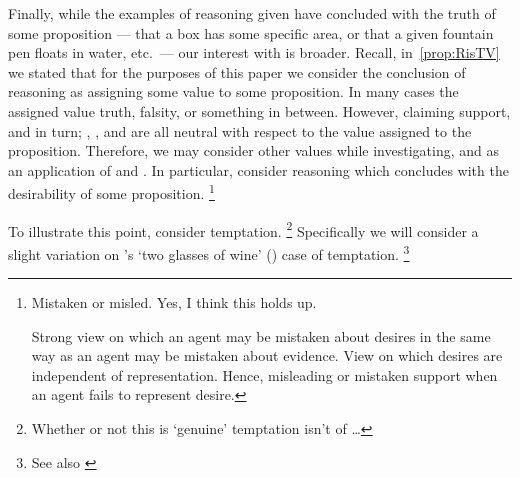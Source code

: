 \begin{note}[Desire]
  Finally, while the examples of reasoning given have concluded with the truth of some proposition --- that a box has some specific area, or that a given fountain pen floats in water, etc.\ --- our interest with \EAS{} is broader.
  Recall, in~\autoref{prop:RisTV} we stated that for the purposes of this paper we consider the conclusion of reasoning as assigning some value to some proposition.
  In many cases the assigned value truth, falsity, or something in between.
  However, claiming support, and in turn; \USE{}, \ESU{}, and \EAS{} are all neutral with respect to the value assigned to the proposition.
  Therefore, we may consider other values while investigating, and as an application of \ESU{} and \EAS{}.
  In particular, consider reasoning which concludes with the desirability of some proposition.\nolinebreak
  \footnote{
    \color{red}
    Mistaken or misled.
    Yes, I think this holds up.

    Strong view on which an agent may be mistaken about desires in the same way as an agent may be mistaken about evidence.
    View on which desires are independent of representation.
    Hence, misleading or mistaken support when an agent fails to represent desire.
  }

  To illustrate this point, consider temptation.\nolinebreak
  \footnote{
    \color{red}
    Whether or not this is `genuine' temptation isn't of \dots
  }
  Specifically we will consider a slight variation on \citeauthor{Bratman:1999ac}'s `two glasses of wine' (\citeyear[38]{Bratman:1999ac}) case of temptation.\nolinebreak
  \footnote{
    \color{red}
    See also \textcite{Bratman:2007ab}
  }
\end{note}

